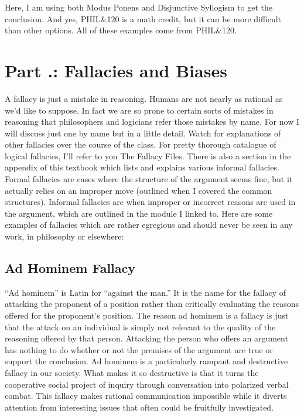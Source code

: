 Here, I am using both Modus Ponens and Disjunctive Syllogism to get the conclusion. And yes, PHIL\&120 is a math credit, but it can be more difficult than other options. All of these examples come from PHIL\&120. 

\section{Part \thechapcount.\theseccount: Fallacies and Biases}
\label{s:p1.4}

A fallacy is just a mistake in reasoning. Humans are not nearly as rational as we’d like to suppose. In fact we are so prone to certain sorts of mistakes in reasoning that philosophers and logicians refer those mistakes by name. For now I will discuss just one by name but in a little detail. Watch for explanations of other fallacies over the course of the class. For pretty thorough catalogue of logical fallacies, I’ll refer to you The Fallacy Files.\autocite{Curtis1} There is also a section in the appendix of this textbook which lists and explains various informal fallacies. Formal fallacies are cases where the structure of the argument seems fine, but it actually relies on an improper move (outlined when I covered the common structures). Informal fallacies are when improper or incorrect reasons are used in the argument, which are outlined in the module I linked to. Here are some examples of fallacies which are rather egregious and should never be seen in any work, in philosophy or elsewhere: 
\subsection{Ad Hominem Fallacy}

“Ad hominem” is Latin for “against the man.” It is the name for the fallacy of attacking the proponent of a position rather than critically evaluating the reasons offered for the proponent’s position. The reason ad hominem is a fallacy is just that the attack on an individual is simply not relevant to the quality of the reasoning offered by that person. Attacking the person who offers an argument has nothing to do whether or not the premises of the argument are true or support the conclusion. Ad hominem is a particularly rampant and destructive fallacy in our society. What makes it so destructive is that it turns the cooperative social project of inquiry through conversation into polarized verbal combat. This fallacy makes rational communication impossible while it diverts attention from interesting issues that often could be fruitfully investigated.

